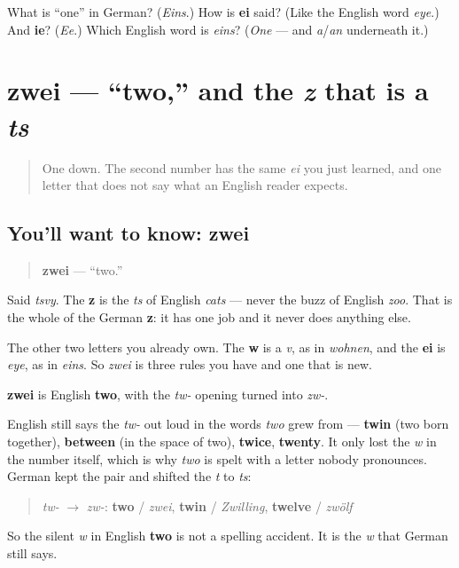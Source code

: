 \begin{tcolorbox}[breakable,colback=teal!4,colframe=teal!35!black,title={Before you move on}]
What is \textquotedblleft{}one\textquotedblright{} in German? (\emph{Eins}.) How is \textbf{ei} said? (Like the English word \emph{eye}.) And \textbf{ie}? (\emph{Ee}.) Which English word is \emph{eins}? (\emph{One} — and \emph{a}/\emph{an} underneath it.)
\end{tcolorbox}
\section[zwei]{zwei — \textquotedblleft{}two,\textquotedblright{} and the \emph{z} that is a \emph{ts}}

\label{lesson:GE-C06-zwei}



\begin{quote}
One down. The second number has the same \emph{ei} you just learned, and one letter that does not say what an English reader expects.
\end{quote}

\subsection*{You'll want to know: zwei}
\begin{quote}
\textbf{zwei} — \textquotedblleft{}two.\textquotedblright{}
\end{quote}

Said \emph{tsvy}. The \textbf{z} is the \emph{ts} of English \emph{cats} — never the buzz of English \emph{zoo}. That is the whole of the German \textbf{z}: it has one job and it never does anything else.

The other two letters you already own. The \textbf{w} is a \emph{v}, as in \emph{wohnen}, and the \textbf{ei} is \emph{eye}, as in \emph{eins}. So \emph{zwei} is three rules you have and one that is new.

\begin{cousinweb}
\textbf{zwei} is English \textbf{two}, with the \emph{tw-} opening turned into \emph{zw-}.

English still says the \emph{tw-} out loud in the words \emph{two} grew from — \textbf{twin} (two born together), \textbf{between} (in the space of two), \textbf{twice}, \textbf{twenty}. It only lost the \emph{w} in the number itself, which is why \emph{two} is spelt with a letter nobody pronounces. German kept the pair and shifted the \emph{t} to \emph{ts}:

\begin{quote}
\emph{tw-} $\to$ \emph{zw-}: \textbf{two} / \emph{zwei}, \textbf{twin} / \emph{Zwilling}, \textbf{twelve} / \emph{zwölf}
\end{quote}

So the silent \emph{w} in English \textbf{two} is not a spelling accident. It is the \emph{w} that German still says.
\end{cousinweb}

